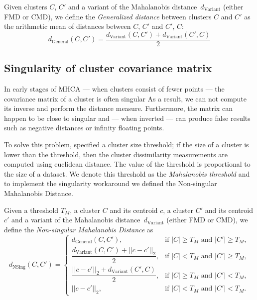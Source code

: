 \begin{defn}
	Given clusters $C$, $C'$ and a variant of the Mahalanobis distance~$d_\text{Variant}$ (either FMD or CMD), we define the \emph{Generalized distance} between clusters $C$ and $C'$ as the arithmetic mean of distances between $C$, $C'$ and $C'$, $C$:
	$$d_\text{General}(C,C') = \frac{d_\text{Variant}(C,C')+d_\text{Variant}(C',C)}{2}$$
	\label{def01:gene}
\end{defn}  


\subsection{Singularity of cluster covariance matrix}

In early stages of MHCA --- when clusters consist of fewer points --- the covariance matrix of a cluster is often singular As a result, we can not compute its inverse and perform the distance measure. Furthermore, the matrix can happen to be close to singular and --- when inverted --- can produce false results such as negative distances or infinity floating points.

To solve this problem, \citet{fivser2012detection} specified a cluster size threshold; if the size of a cluster is lower than the threshold, then the cluster dissimilarity measurements are computed using euclidean distance. The value of the threshold is proportional to the size of a dataset. We denote this threshold as the \emph{Mahalanobis threshold} and to implement the singularity workaround we defined the Non-singular Mahalanobis Distance.

\begin{defn}
	Given a threshold $T_M$, a cluster $C$ and its centroid $c$, a cluster $C'$ and its centroid $c'$ and a variant of the Mahalanobis distance~$d_\text{Variant}$ (either FMD or CMD), we define the \emph{Non-singular Mahalanobis Distance} as
	$$
	d_\text{NSing}(C,C')=
	\begin{cases}
		d_\text{General}(C, C'),                       & \text{if $|C|\ge T_M$ and $|C'|\ge T_M$}, \\
		\dfrac{d_\text{Variant}(C, C')+||c-c'||_2}{2}, & \text{if $|C| < T_M$ and $|C'|\ge T_M$},  \\
		\dfrac{||c-c'||_2+d_\text{Variant}(C', C)}{2}, & \text{if $|C|\ge T_M$ and $|C'|< T_M$},   \\
		||c-c'||_2,                                    & \text{if $|C|< T_M$ and $|C'|< T_M$}.
	\end{cases}
	$$
	\label{def01:alt}
\end{defn}

